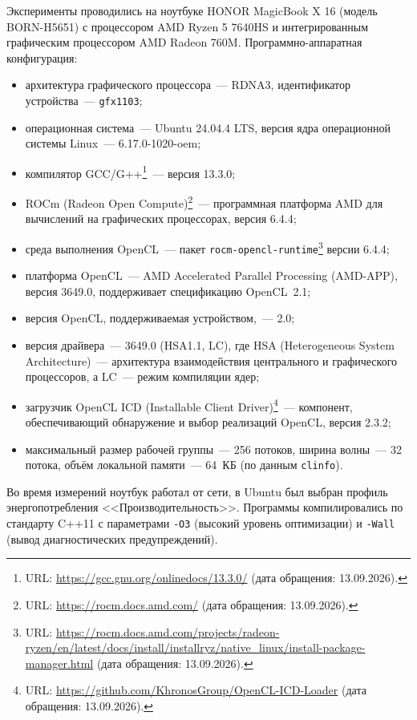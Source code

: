 \documentclass[a4paper]{article}
\begin{document}
Эксперименты проводились на ноутбуке HONOR MagicBook X 16 (модель
BORN-H5651) с процессором AMD Ryzen 5 7640HS и интегрированным
графическим процессором AMD Radeon 760M. Программно-аппаратная
конфигурация:
\begin{itemize}
    \item архитектура графического процессора~--- RDNA3, идентификатор
    устройства~--- \texttt{gfx1103};
    \item операционная система~--- Ubuntu 24.04.4 LTS, версия ядра
    операционной системы Linux~--- 6.17.0-1020-oem;
    \item компилятор GCC/G++\footnote{URL: \url{https://gcc.gnu.org/onlinedocs/13.3.0/}
    (дата обращения: 13.09.2026).}~--- версия 13.3.0;
    \item ROCm (Radeon Open Compute)\footnote{URL: \url{https://rocm.docs.amd.com/}
    (дата обращения: 13.09.2026).}~--- программная платформа AMD для
    вычислений на графических процессорах, версия 6.4.4;
    \item среда выполнения OpenCL~--- пакет
    \texttt{rocm-opencl-runtime}\footnote{URL: \url{https://rocm.docs.amd.com/projects/radeon-ryzen/en/latest/docs/install/installryz/native_linux/install-package-manager.html}
    (дата обращения: 13.09.2026).} версии 6.4.4;
    \item платформа OpenCL~--- AMD Accelerated Parallel Processing
    (AMD-APP), версия 3649.0, поддерживает спецификацию OpenCL~2.1;
    \item версия OpenCL, поддерживаемая устройством,~--- 2.0;
    \item версия драйвера~--- 3649.0 (HSA1.1, LC), где HSA
    (Heterogeneous System Architecture)~--- архитектура взаимодействия
    центрального и графического процессоров, а LC~--- режим компиляции
    ядер;
    \item загрузчик OpenCL ICD (Installable Client
    Driver)\footnote{URL: \url{https://github.com/KhronosGroup/OpenCL-ICD-Loader}
    (дата обращения: 13.09.2026).}~--- компонент, обеспечивающий
    обнаружение и выбор реализаций OpenCL, версия 2.3.2;
    \item максимальный размер рабочей группы~--- 256 потоков, ширина
    волны~--- 32 потока, объём локальной памяти~--- 64~КБ (по данным
    \texttt{clinfo}).
\end{itemize}

Во время измерений ноутбук работал от сети, в Ubuntu был выбран профиль
энергопотребления <<Производительность>>. Программы компилировались
по стандарту C++11 с параметрами \texttt{-O3} (высокий уровень
оптимизации) и \texttt{-Wall} (вывод диагностических предупреждений).
\end{document}
